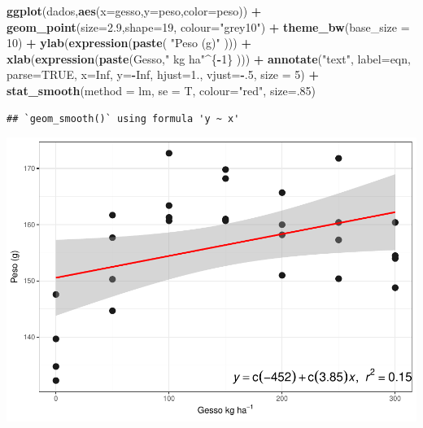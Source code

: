 \documentclass[
]{book}
\newenvironment{Shaded}{\begin{snugshade}}{\end{snugshade}}
\newcommand{\DataTypeTok}[1]{\textcolor[rgb]{0.13,0.29,0.53}{#1}}
\newcommand{\DecValTok}[1]{\textcolor[rgb]{0.00,0.00,0.81}{#1}}
\newcommand{\FloatTok}[1]{\textcolor[rgb]{0.00,0.00,0.81}{#1}}
\newcommand{\KeywordTok}[1]{\textcolor[rgb]{0.13,0.29,0.53}{\textbf{#1}}}
\newcommand{\NormalTok}[1]{#1}
\newcommand{\OperatorTok}[1]{\textcolor[rgb]{0.81,0.36,0.00}{\textbf{#1}}}
\newcommand{\OtherTok}[1]{\textcolor[rgb]{0.56,0.35,0.01}{#1}}
\newcommand{\StringTok}[1]{\textcolor[rgb]{0.31,0.60,0.02}{#1}}
\begin{document}
\begin{Shaded}
\begin{Highlighting}[]
\KeywordTok{ggplot}\NormalTok{(dados,}\KeywordTok{aes}\NormalTok{(}\DataTypeTok{x=}\NormalTok{gesso,}\DataTypeTok{y=}\NormalTok{peso,}\DataTypeTok{color=}\NormalTok{peso))  }\OperatorTok{+}\StringTok{ }
\StringTok{  }\KeywordTok{geom_point}\NormalTok{(}\DataTypeTok{size=}\FloatTok{2.9}\NormalTok{,}\DataTypeTok{shape=}\DecValTok{19}\NormalTok{, }\DataTypeTok{colour=}\StringTok{"grey10"}\NormalTok{) }\OperatorTok{+}\StringTok{ }
\StringTok{    }\KeywordTok{theme_bw}\NormalTok{(}\DataTypeTok{base_size =} \DecValTok{10}\NormalTok{) }\OperatorTok{+}\StringTok{ }
\StringTok{        }\KeywordTok{ylab}\NormalTok{(}\KeywordTok{expression}\NormalTok{(}\KeywordTok{paste}\NormalTok{(  }\StringTok{"Peso (g)"}\NormalTok{ )))  }\OperatorTok{+}\StringTok{ }
\StringTok{        }\KeywordTok{xlab}\NormalTok{(}\KeywordTok{expression}\NormalTok{(}\KeywordTok{paste}\NormalTok{(Gesso,}\StringTok{" kg ha"}\OperatorTok{^}\NormalTok{\{}\OperatorTok{-}\DecValTok{1}\NormalTok{\} )))  }\OperatorTok{+}\StringTok{ }
\StringTok{        }\KeywordTok{annotate}\NormalTok{(}\StringTok{"text"}\NormalTok{, }\DataTypeTok{label=}\NormalTok{eqn, }\DataTypeTok{parse=}\OtherTok{TRUE}\NormalTok{, }\DataTypeTok{x=}\OtherTok{Inf}\NormalTok{, }\DataTypeTok{y=}\OperatorTok{-}\OtherTok{Inf}\NormalTok{,}
             \DataTypeTok{hjust=}\FloatTok{1.}\NormalTok{, }\DataTypeTok{vjust=}\OperatorTok{-}\NormalTok{.}\DecValTok{5}\NormalTok{, }\DataTypeTok{size =} \DecValTok{5}\NormalTok{)  }\OperatorTok{+}\StringTok{    }
\StringTok{        }\KeywordTok{stat_smooth}\NormalTok{(}\DataTypeTok{method =}\NormalTok{ lm, }\DataTypeTok{se =}\NormalTok{ T, }\DataTypeTok{colour=}\StringTok{"red"}\NormalTok{, }\DataTypeTok{size=}\NormalTok{.}\DecValTok{85}\NormalTok{)}
\end{Highlighting}
\end{Shaded}

\begin{verbatim}
## `geom_smooth()` using formula 'y ~ x'
\end{verbatim}

\includegraphics{TudodoR_files/figure-latex/unnamed-chunk-226-1.pdf}
\end{document}
